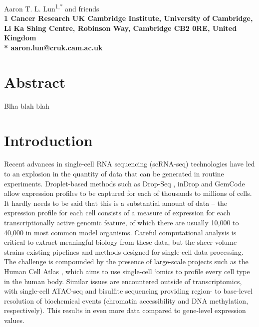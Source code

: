 \documentclass[10pt,letterpaper]{article}
\begin{document}
\vspace*{0.35in}

\begin{flushleft}
{\Large
    \textbf{}
}
\newline

Aaron T. L. Lun\textsuperscript{1,*}
and friends
\\
\bigskip
\bf{1} Cancer Research UK Cambridge Institute, University of Cambridge, Li Ka Shing Centre, Robinson Way, Cambridge CB2 0RE, United Kingdom
\\
\bigskip
* aaron.lun@cruk.cam.ac.uk

\end{flushleft}

\section*{Abstract}
Blha blah blah

\linenumbers

\section*{Introduction}
Recent advances in single-cell RNA sequencing (scRNA-seq) technologies have led to an explosion in the quantity of data that can be generated in routine experiments.
Droplet-based methods such as Drop-Seq \cite{macosko2015highly}, inDrop \cite{klein2015droplet} and GemCode \cite{zheng2017massively} allow expression profiles to be captured for each of thousands to millions of cells.
It hardly needs to be said that this is a substantial amount of data -- the expression profile for each cell consists of a measure of expression for each transcriptionally active genomic feature, of which there are usually 10,000 to 40,000 in most common model organisms.
Careful computational analysis is critical to extract meaningful biology from these data, but the sheer volume strains existing pipelines and methods designed for single-cell data processing.
The challenge is compounded by the presence of large-scale projects such as the Human Cell Atlas \cite{regev2017human}, which aims to use single-cell `omics to profile every cell type in the human body.
Similar issues are encountered outside of transcriptomics, with single-cell ATAC-seq \cite{buenrostro2015single} and bisulfite sequencing \cite{smallwood2014single} providing region- to base-level resolution of biochemical events (chromatin accessibility and DNA methylation, respectively).
This results in even more data compared to gene-level expression values.
\end{document}
